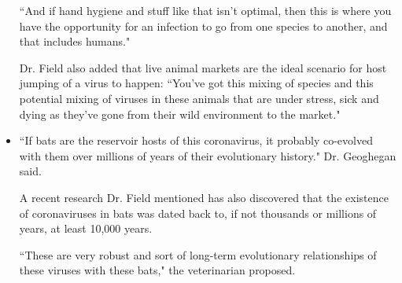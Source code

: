\begin{itemize}
        \par ``And if hand hygiene and stuff like that isn't optimal, then this is where you have the opportunity for an infection to go from one species to another, and that includes humans."
        \par Dr. Field also added that live animal markets are the ideal scenario for host jumping of a virus to happen:
        ``You've got this mixing of species and this potential mixing of viruses in these animals that are under stress, sick and dying as they've gone from their wild environment to the market."
        \item ``If bats are the reservoir hosts of this coronavirus, it probably co-evolved with them over millions of years of their evolutionary history." Dr. Geoghegan said.
        \par A recent research Dr. Field mentioned has also discovered that the existence of coronaviruses in bats was dated back to, if not thousands or millions of years, at least 10,000 years.
        \par ``These are very robust and sort of long-term evolutionary relationships of these viruses with these bats," the veterinarian proposed.
      \end{itemize}


